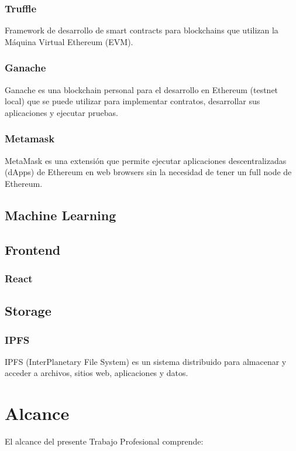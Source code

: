 \documentclass[
11pt, %
spanish, %
singlespacing, %
headsepline, %
]{MastersDoctoralThesis} %
\begin{document}
\subsection{Truffle}
Framework de desarrollo de smart contracts para blockchains que utilizan la Máquina Virtual Ethereum (EVM).

\subsection{Ganache}
Ganache es una blockchain personal para el desarrollo en Ethereum (testnet local) que se puede utilizar para implementar contratos, desarrollar sus aplicaciones y ejecutar pruebas.

\subsection{Metamask}
MetaMask es una extensión que permite ejecutar aplicaciones descentralizadas (dApps) de Ethereum en web browsers sin la necesidad de tener un full node de Ethereum.

\section{Machine Learning}


\section{Frontend}

\subsection{React}

\section{Storage}

\subsection{IPFS}
IPFS (InterPlanetary File System) es un sistema distribuido para almacenar y acceder a archivos, sitios web, aplicaciones y datos.

\chapter{Alcance}
El alcance del presente Trabajo Profesional comprende:
\end{document}
